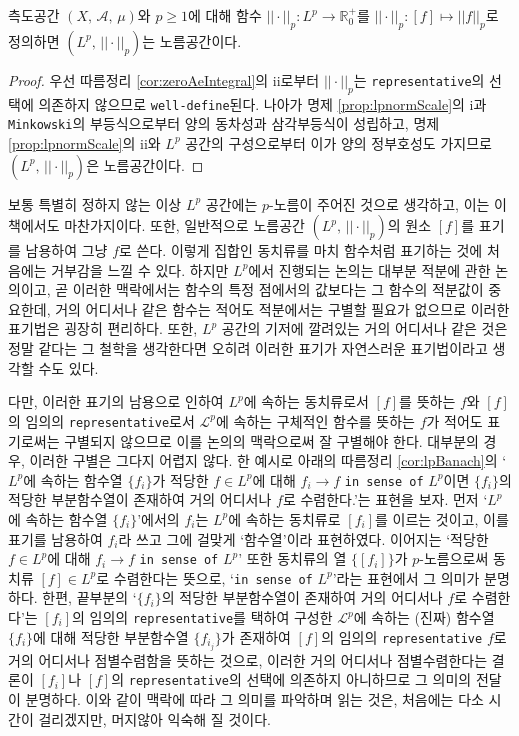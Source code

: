 \begin{proposition}
    측도공간 $(X,\,\mathcal{A},\,\mu)$와 $p\geq1$에 대해 함수 $||\cdot||_p:L^p\to\mathbb{R}_0^+$를 $||\cdot||_p:[f]\mapsto||f||_p$로 정의하면 $(L^p,\,||\cdot||_p)$는 노름공간이다.
\end{proposition}

\begin{proof}
    우선 따름정리 \ref{cor:zeroAeIntegral}의 ii로부터 $||\cdot||_p$는 \texttt{representative}의 선택에 의존하지 않으므로 \texttt{well-define}된다. 나아가 명제 \ref{prop:lpnormScale}의 i과 \texttt{Minkowski}의 부등식으로부터 양의 동차성과 삼각부등식이 성립하고, 명제 \ref{prop:lpnormScale}의 ii와 $L^p$ 공간의 구성으로부터 이가 양의 정부호성도 가지므로 $(L^p,\,||\cdot||_p)$은 노름공간이다.
\end{proof}

보통 특별히 정하지 않는 이상 $L^p$ 공간에는 $p$-노름이 주어진 것으로 생각하고, 이는 이 책에서도 마찬가지이다. 또한, 일반적으로 노름공간 $(L^p,\,||\cdot||_p)$의 원소 $[f]$를 표기를 남용하여 그냥 $f$로 쓴다. 이렇게 집합인 동치류를 마치 함수처럼 표기하는 것에 처음에는 거부감을 느낄 수 있다. 하지만 $L^p$에서 진행되는 논의는 대부분 적분에 관한 논의이고, 곧 이러한 맥락에서는 함수의 특정 점에서의 값보다는 그 함수의 적분값이 중요한데, 거의 어디서나 같은 함수는 적어도 적분에서는 구별할 필요가 없으므로 이러한 표기법은 굉장히 편리하다. 또한, $L^p$ 공간의 기저에 깔려있는 거의 어디서나 같은 것은 정말 같다는 그 철학을 생각한다면 오히려 이러한 표기가 자연스러운 표기법이라고 생각할 수도 있다.

다만, 이러한 표기의 남용으로 인하여 $L^p$에 속하는 동치류로서 $[f]$를 뜻하는 $f$와 $[f]$의 임의의 \texttt{representative}로서 $\mathcal{L}^p$에 속하는 구체적인 함수를 뜻하는 $f$가 적어도 표기로써는 구별되지 않으므로 이를 논의의 맥락으로써 잘 구별해야 한다. 대부분의 경우, 이러한 구별은 그다지 어렵지 않다. 한 예시로 아래의 따름정리 \ref{cor:lpBanach}의 `$L^p$에 속하는 함수열 $\{f_i\}$가 적당한 $f\in L^p$에 대해 $f_i\to f$ \texttt{in sense of} $L^p$이면 $\{f_i\}$의 적당한 부분함수열이 존재하여 거의 어디서나 $f$로 수렴한다.'는 표현을 보자. 먼저 `$L^p$에 속하는 함수열 $\{f_i\}$'에서의 $f_i$는 $L^p$에 속하는 동치류로 $[f_i]$를 이르는 것이고, 이를 표기를 남용하여 $f_i$라 쓰고 그에 걸맞게 `함수열'이라 표현하였다. 이어지는 `적당한 $f\in L^p$에 대해 $f_i\to f$ \texttt{in sense of} $L^p$' 또한 동치류의 열 $\{[f_i]\}$가 $p$-노름으로써 동치류 $[f]\in L^p$로 수렴한다는 뜻으로, `\texttt{in sense of} $L^p$'라는 표현에서 그 의미가 분명하다. 한편, 끝부분의 `$\{f_i\}$의 적당한 부분함수열이 존재하여 거의 어디서나 $f$로 수렴한다'는 $[f_i]$의 임의의 \texttt{representative}를 택하여 구성한 $\mathcal{L}^p$에 속하는 (진짜) 함수열 $\{f_i\}$에 대해 적당한 부분함수열 $\{f_{i_j}\}$가 존재하여 $[f]$의 임의의 \texttt{representative} $f$로 거의 어디서나 점별수렴함을 뜻하는 것으로, 이러한 거의 어디서나 점별수렴한다는 결론이 $[f_i]$나 $[f]$의 \texttt{representative}의 선택에 의존하지 아니하므로 그 의미의 전달이 분명하다. 이와 같이 맥락에 따라 그 의미를 파악하며 읽는 것은, 처음에는 다소 시간이 걸리겠지만, 머지않아 익숙해 질 것이다.

